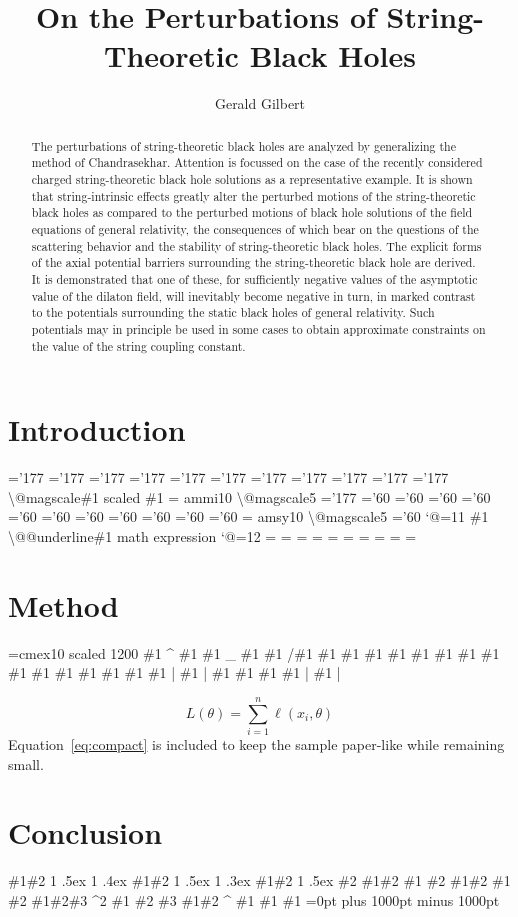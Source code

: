 \documentclass[11pt]{article}
\title{On the Perturbations of String-Theoretic Black Holes}
\author{Gerald Gilbert}
\date{}
\begin{document}
\maketitle
\begin{abstract}

The perturbations of string-theoretic black holes are analyzed by generalizing the method of Chandrasekhar. Attention is focussed on the case of the recently considered charged string-theoretic black hole solutions as a representative example. It is shown that string-intrinsic effects greatly alter the perturbed motions of the string-theoretic black holes as compared to the perturbed motions of black hole solutions of the field equations of general relativity, the consequences of which bear on the questions of the scattering behavior and the stability of string-theoretic black holes. The explicit forms of the axial potential barriers surrounding the string-theoretic black hole are derived. It is demonstrated that one of these, for sufficiently negative values of the asymptotic value of the dilaton field, will inevitably become negative in turn, in marked contrast to the potentials surrounding the static black holes of general relativity. Such potentials may in principle be used in some cases to obtain approximate constraints on the value of the string coupling constant.

\end{abstract}

\section{Introduction}

='177 ='177 ='177 ='177 ='177 ='177 ='177 ='177 ='177 ='177 ='177 \textbackslash{}@magscale\#1 scaled \#1 = ammi10 \textbackslash{}@magscale5 ='177 ='60 ='60 ='60 ='60 ='60 ='60 ='60 ='60 ='60 ='60 ='60 = amsy10 \textbackslash{}@magscale5 ='60 `@=11 \#1 \textbackslash{}@@underline\#1 math expression `@=12 = = = = = = = = = =

\section{Method}

=cmex10 scaled 1200 \#1 \textasciicircum{} \#1 \#1 \_ \#1 \#1 /\#1 \#1 \#1 \#1 \#1 \#1 \#1 \#1 \#1 \#1 \#1 \#1 \#1 \#1 \#1 \#1 | \#1 | \#1 \#1 \#1 \#1 | \#1 |

\begin{equation}
\label{eq:compact}
L(\theta) = \sum_{i=1}^{n} \ell(x_i, \theta)
\end{equation}
Equation~\ref{eq:compact} is included to keep the sample paper-like while remaining small.

\section{Conclusion}

\#1\#2 1 .5ex 1 .4ex \#1\#2 1 .5ex 1 .3ex \#1\#2 1 .5ex \#2 \#1\#2 \#1 \#2 \#1\#2 \#1 \#2 \#1\#2\#3 \textasciicircum{}2 \#1 \#2 \#3 \#1\#2 \textasciicircum{} \#1 \#1 \#1 =0pt plus 1000pt minus 1000pt
\end{document}
